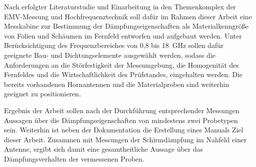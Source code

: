 \vspace{\linespace}
Nach erfolgter Literaturstudie und Einarbeitung in den Themenkomplex der EMV-Messung und Hochfrequenztechnik soll dafür im Rahmen dieser Arbeit eine Messkabine zur Bestimmung der Dämpfungseigenschaften als Materialkenngröße von Folien und Schäumen im Fernfeld entworfen und aufgebaut werden. Unter Berücksichtigung des Frequenzbereiches von 0,8 bis \SI{18}{\giga\hertz} sollen dafür geeignete Bau- und Dichtungselemente ausgewählt werden, sodass die Anforderungen an die Störfestigkeit der Messumgebung, die Homogenität des Fernfeldes und die Wirtschaftlichkeit des Prüfstandes, eingehalten werden. Die bereits vorhandenen Hornantennen und die Materialproben sind weiterhin geeignet zu positionieren.
\par
\vspace{\linespace}
Ergebnis der Arbeit sollen nach der Durchführung entsprechender Messungen Aussagen über die Dämpfungseigenschaften von mindestens zwei Probetypen sein. Weiterhin ist neben der Dokumentation die Erstellung eines Manuals Ziel dieser Arbeit. Zusammen mit Messungen der Schirmdämpfung im Nahfeld einer Antenne, ergibt sich damit eine gesamtheitliche Aussage über das Dämpfungsverhalten der vermessenen Proben.